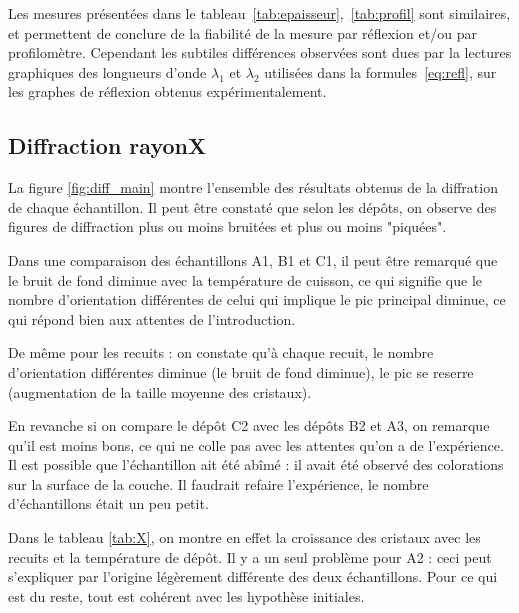 \documentclass[a4paper,12pt,oneside]{article}
\begin{document}
Les mesures présentées dans le tableau~\ref{tab:epaisseur},~\ref{tab:profil} sont similaires, et permettent de conclure de la fiabilité de la mesure par réflexion et/ou par profilomètre. Cependant les subtiles différences observées sont dues par la lectures graphiques des longueurs d'onde $\lambda_1$ et $\lambda_2$ utilisées dans la formules~\ref{eq:refl}, sur les graphes de réflexion obtenus expérimentalement.

\subsection{Diffraction rayonX}
La figure \ref{fig:diff_main} montre l'ensemble des résultats obtenus de la diffration de chaque échantillon. Il peut être constaté que selon les dépôts, on observe des figures de diffraction plus ou moins bruitées et plus ou moins "piquées".

Dans une comparaison des échantillons A1, B1 et C1, il peut être remarqué que le bruit de fond diminue avec la température de cuisson, ce qui signifie que le nombre d'orientation différentes de celui qui implique le pic principal diminue, ce qui répond bien aux attentes de l'introduction.

De même pour les recuits : on constate qu'à chaque recuit, le nombre d'orientation différentes diminue (le bruit de fond diminue), le pic se reserre (augmentation de la taille moyenne des cristaux).

En revanche si on compare le dépôt C2 avec les dépôts B2 et A3, on remarque qu'il est moins bons, ce qui ne colle pas avec les attentes qu'on a de l'expérience. Il est possible que l'échantillon ait été abîmé : il avait été observé des colorations sur la surface de la couche. Il faudrait refaire l'expérience, le nombre d'échantillons était un peu petit.

Dans le tableau \ref{tab:X}, on montre en effet la croissance des cristaux avec les recuits et la température de dépôt. Il y a un seul problème pour A2 : ceci peut s'expliquer par l'origine légèrement différente des deux échantillons. Pour ce qui est du reste, tout est cohérent avec les hypothèse initiales.
\end{document}
